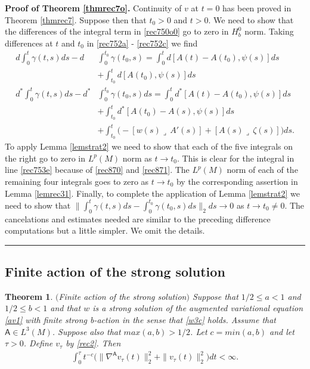 \documentclass[12pt]{article}
\newtheorem{theorem}{Theorem}[section]
\newenvironment{proof}[1][Proof]{\textbf{#1.} }{\ \rule{0.5em}{0.5em}}
\def \({\Big(}
\def \){\Big)}
\def \As{\mathsf{A}}
\def \n{\nabla}
\def \eref{\eqref}
\def \lrc{\lrcorner\,}
\numberwithin{equation}{section}
\begin{document}
\bigskip
\noindent
\begin{proof}[Proof of Theorem \ref{thmrec7o}]
 Continuity of $v$ at $t =0$ has been proved in Theorem \ref{thmrec7}.  Suppose then that
$t_0 > 0$ and $t >0$. We need to show that the differences of the integral
 term in \eref{rec750o0} go to zero in $H_b^0$ norm.  Taking differences at $t$ and $t_0$ in 
 \eref{rec752a} - \eref{rec752c} we find
\begin{align}
    d\int_0^t \gamma(t,s) ds  - d&\int_0^{t_0} \gamma(t_0,s)
= \int_0^t d[A(t) -A(t_0), \psi(s) ] ds  \label{rec753a} \\
&+\int_{t_0}^t d[A(t_0), \psi(s)] ds                           \label{rec753b}\\
    d^*\int_0^t \gamma(t,s) ds- d^*&\int_0^{t_0} \gamma(t_0,s) ds
 =  \int_0^t d^*[A(t)-A(t_0), \psi(s) ] ds   \label{rec753c} \\
 &+\int_{t_0}^t  d^*[A(t_0) - A(s),\psi(s)] ds          \label{rec753d}\\
 &+ \int_{t_0}^t \( -[w(s) \lrc A'(s)] + [A(s) \lrc \zeta(s)] \) ds.     \label{rec753e}
\end{align}
To apply Lemma  \ref{lemstrat2} we need to show that each of the five integrals on the right go to
zero in $L^p(M)$ norm as $t\rightarrow t_0$. This is clear for the integral in line \eref{rec753e} because of
\eref{rec870} and \eref{rec871}. The $L^p(M)$ norm of each of the remaining four integrals goes to zero
as $t\rightarrow t_0$ by the corresponding assertion in Lemma \ref{lemrec31}.
Finally, to complete the application of Lemma \ref{lemstrat2} we need to show that 
$\|\int_0^t \gamma(t,s)ds - \int_0^{t_0}\gamma(t_0,s)ds\|_2 ds \rightarrow 0$ as $t\rightarrow t_0 \ne 0$. 
The cancelations and estimates
needed are similar to the preceding difference computations but a little simpler. We omit the details.
\end{proof}
 


\subsection{Finite action of the strong solution} \label{secrecab} 
  
  
\begin{theorem}\label{thmrec9b} $($Finite action of the strong solution$)$ 
Suppose that $1/2 \le a < 1$ and $1/2\le b <1$ and that $w$
is  a strong solution of the augmented variational equation \eref{av1} with  finite strong b-action
in the sense that \eref{w3c} holds.
Assume that $\As \in L^3(M)$. Suppose also that $max(a,b) > 1/2$.  Let $c = min(a,b)$ and
let  $\tau >0$.  
 Define $v_\tau$ by \eref{rec2}. Then
\begin{align}
\int_0^\tau t^{-c}\Big(  \|\n^{\As} v_\tau(t)\|_2^2  +\|v_\tau(t)\|_2^2 \Big) dt < \infty.      \label{rec880}
\end{align}
\end{theorem}
\end{document}
